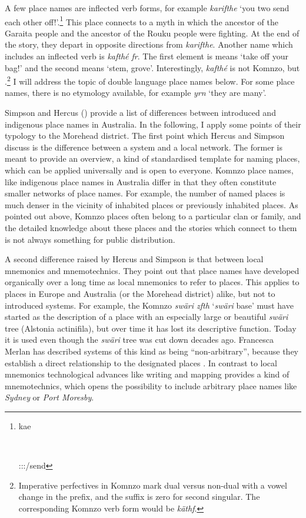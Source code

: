 A few place names are inflected verb forms, for example \emph{karifthe} `you two send each other off!'.\footnote{\parbox{0.02cm}{\hfill}\parbox{6cm}{kae}\\ \parbox{0.1cm}{\hfill}\parbox{6.06cm}{\Stdu:\Sbj:\Imp:\Pfv/send}} This place connects to a myth in which the ancestor of the Garaita people and the ancestor of the Rouku people were fighting. At the end of the story, they depart in opposite directions from \emph{karifthe}. Another name which includes an inflected verb is \emph{kafthé fr}. The first element is means `take off your bag!' and the second means `stem, grove'. Interestingly, \emph{kafthé} is not Komnzo, but .\footnote{Imperative perfectives in Komnzo mark dual versus non-dual with a vowel change in the prefix, and the suffix is zero for second singular. The corresponding Komnzo verb form would be \emph{käthf}.} I will address the topic of double language place names below. For some place names, there is no etymology available, for example \emph{yrn} `they are many'.%

Simpson and Hercus (\citeyear{Hercus:2002ul}) provide a list of differences between introduced and indigenous place names in Australia. In the following, I apply some points of their typology to the Morehead district. The first point which Hercus and Simpson discuss is the difference between a system and a local network. The former is meant to provide an overview, a kind of standardised template for naming places, which can be applied universally and is open to everyone. Komnzo place names, like indigenous place names in Australia differ in that they often constitute smaller networks of place names. For example, the number of named places is much denser in the vicinity of inhabited places or previously inhabited places. As pointed out above, Komnzo places often belong to a particular clan or family, and the detailed knowledge about these places and the stories which connect to them is not always something for public distribution.%

A second difference raised by Hercus and Simpson is that between local mnemonics and mnemotechnics. They point out that place names have developed organically over a long time as local mnemonics to refer to places. This applies to places in Europe and Australia (or the Morehead district) alike, but not to introduced  systems. For example, the Komnzo  \emph{swäri zfth} `\emph{swäri} base' must have started as the description of a place with an especially large or beautiful \emph{swäri} tree (Alstonia actinifila), but over time it has lost its descriptive function. Today it is used even though the \emph{swäri} tree was cut down decades ago. Francesca Merlan has described  systems of this kind as being ``non-arbitrary'', because they establish a direct relationship to the designated places \citep{Merlan:2001wp}. In contrast to local mnemonics technological advances like writing and mapping provides a kind of mnemotechnics, which opens the possibility to include arbitrary place names like \emph{Sydney} or \emph{Port Moresby}.%

